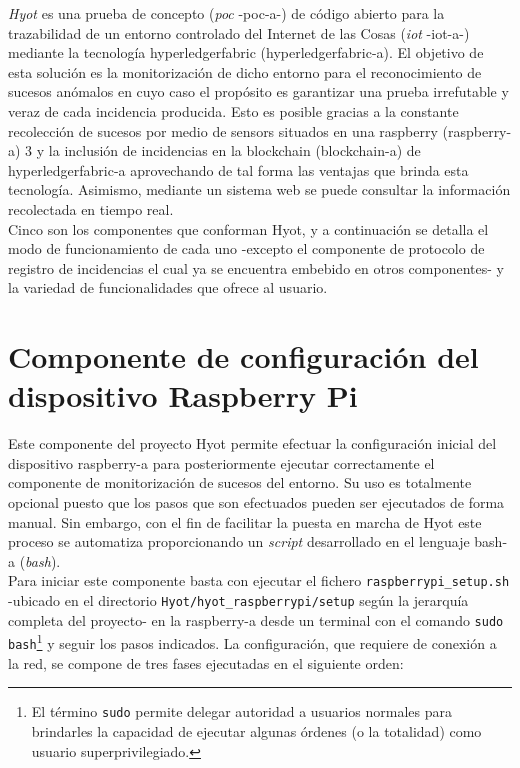 \documentclass[12pt,a4paper, twoside]{report}
\begin{document}
	\textit{Hyot} es una prueba de concepto (\textit{\gls{poc}} -\gls{poc-a}-) de código abierto para la trazabilidad de un entorno controlado del Internet de las Cosas (\textit{\gls{iot}} -\gls{iot-a}-) mediante la tecnología \gls{hyperledgerfabric} (\gls{hyperledgerfabric-a}). El objetivo de esta solución es la monitorización de dicho entorno para el reconocimiento de sucesos anómalos en cuyo caso el propósito es garantizar una prueba irrefutable y veraz de cada incidencia producida. Esto es posible gracias a la constante recolección de sucesos por medio de \glspl{sensor} situados en una \gls{raspberry} (\gls{raspberry-a}) 3 y la inclusión de incidencias en la \Gls{blockchain} (\gls{blockchain-a}) de \gls{hyperledgerfabric-a} aprovechando de tal forma las ventajas que brinda esta tecnología. Asimismo, mediante un sistema web se puede consultar la información recolectada en tiempo real. \\
	
	 Cinco son los componentes que conforman Hyot, y a continuación se detalla el modo de funcionamiento de cada uno -excepto el componente de protocolo de registro de incidencias el cual ya se encuentra embebido en otros componentes- y la variedad de funcionalidades que ofrece al usuario.
	 
	 \section{Componente de configuración del dispositivo Raspberry Pi} \label{setup_rpi}
	 
	 Este componente del proyecto Hyot permite efectuar la configuración inicial del dispositivo \gls{raspberry-a} para posteriormente ejecutar correctamente el componente de monitorización de sucesos del entorno. Su uso es totalmente opcional puesto que los pasos que son efectuados pueden ser ejecutados de forma manual. Sin embargo, con el fin de facilitar la puesta en marcha de Hyot este proceso se automatiza proporcionando un \textit{\gls{script}} desarrollado en el lenguaje \gls{bash-a} (\textit{\gls{bash}}). \\
	 
	Para iniciar este componente basta con ejecutar el fichero \texttt{raspberrypi\_setup.sh} -ubicado en el directorio \texttt{Hyot/hyot\_raspberrypi/setup} según la jerarquía completa del proyecto- en la \gls{raspberry-a} desde un terminal con el comando \texttt{sudo bash}\footnote{El término \texttt{sudo} permite delegar autoridad a usuarios normales para brindarles la capacidad de ejecutar algunas órdenes (o la totalidad) como usuario superprivilegiado.} y seguir los pasos indicados. La configuración, que requiere de conexión a la red, se compone de tres fases ejecutadas en el siguiente orden:
	
\end{document}
